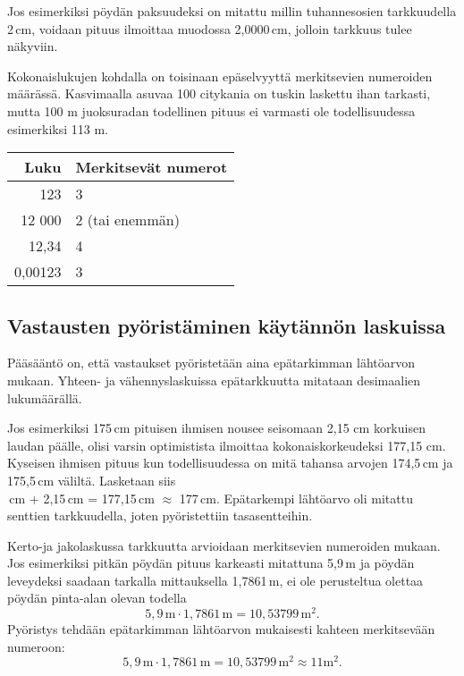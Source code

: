 
Jos esimerkiksi pöydän paksuudeksi on mitattu millin tuhannesosien
tarkkuudella 2\,cm, voidaan pituus ilmoittaa muodossa 2,0000\,cm, jolloin tarkkuus tulee näkyviin. 

Kokonaislukujen kohdalla on toisinaan epäselvyyttä merkitsevien numeroiden määrässä. Kasvimaalla asuvaa 100 citykania on tuskin laskettu ihan tarkasti,
mutta 100 m juoksuradan todellinen pituus ei varmasti ole todellisuudessa
esimerkiksi 113 m.

\begin{center}
\begin{tabular}{r|l}
Luku & Merkitsevät numerot \\
\hline
123 & 3 \\
12 000 & 2 (tai enemmän)\\
12,34 & 4 \\
0,00123 & 3
\end{tabular}
\end{center}

\subsection*{Vastausten pyöristäminen käytännön laskuissa}

Pääsääntö on, että vastaukset pyöristetään aina epätarkimman
lähtöarvon mukaan. Yhteen- ja vähennyslaskuissa epätarkkuutta
mitataan desimaalien lukumäärällä.

Jos esimerkiksi 175\,cm pituisen ihmisen
nousee seisomaan 2,15 cm korkuisen laudan päälle, olisi varsin
optimistista ilmoittaa kokonaiskorkeudeksi 177,15 cm. Kyseisen ihmisen pituus kun todellisuudessa on mitä tahansa arvojen
174,5\,cm ja 175,5\,cm väliltä. Lasketaan siis\\
\,cm + 2,15\,cm = 177,15\,cm $\approx$ 177\,cm.
Epätarkempi lähtöarvo oli mitattu senttien tarkkuudella, joten pyöristettiin tasasentteihin.

Kerto-ja jakolaskussa tarkkuutta arvioidaan merkitsevien numeroiden mukaan. Jos esimerkiksi pitkän pöydän pituus karkeasti
mitattuna 5,9\,m ja pöydän leveydeksi saadaan tarkalla mittauksella
1,7861\,m, ei ole perusteltua olettaa pöydän pinta-alan olevan todella
\[ 5,9\,\textrm{m} \cdot 1,7861\,\textrm{m} = 10,53799\,\textrm{m}^2. \]
Pyöristys tehdään epätarkimman
lähtöarvon mukaisesti kahteen merkitsevään numeroon:
\[ 5,9\,\textrm{m} \cdot 1,7861\,\textrm{m} = 10,53799\,\textrm{m}^2 \approx 11 \textrm{m}^2.\]

